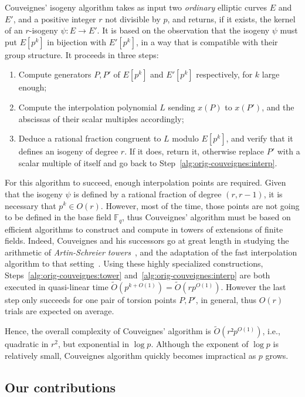 \documentclass{lms}
\newcommand{\F}{\mathbb{F}}
\newcommand{\tildO}{\tilde{O}}
\begin{document}
Couveignes' isogeny algorithm takes as input two \emph{ordinary}
elliptic curves $E$ and $E'$, and a positive integer $r$ not
divisible by $p$, and returns, if it exists, the kernel of an
$r$-isogeny $ψ:E\to E'$. It is based on the observation that the
isogeny $ψ$ must put $E[p^k]$ in bijection with $E'[p^k]$, in a way
that is compatible with their group structure. It proceeds in three
steps:
\begin{enumerate}
\item\label{alg:orig-couveignes:tower} Compute generators $P,P'$ of
  $E[p^k]$ and $E'[p^k]$ respectively, for $k$ large enough;
\item\label{alg:orig-couveignes:interp} Compute the interpolation
  polynomial $L$ sending $x(P)$ to $x(P')$, and the abscissas of
  their scalar multiples accordingly;
\item\label{alg:orig-couveignes:rational} Deduce a rational fraction
  congruent to $L$ modulo $E[p^k]$, and verify that it
  defines an isogeny of degree $r$. If it does, return it, otherwise
  replace $P'$ with a scalar multiple of itself and go back to
  Step~\ref{alg:orig-couveignes:interp}.
\end{enumerate}

For this algorithm to succeed, enough interpolation points are
required. Given that the isogeny $ψ$ is defined by a rational fraction
of degree $(r,r-1)$, it is necessary that $p^k∈O(r)$. However, most of
the time, those points are not going to be defined in the base field
$\F_q$, thus Couveignes' algorithm must be based on efficient
algorithms to construct and compute in towers of extensions of finite
fields. Indeed, Couveignes and his successors go at great length in
studying the arithmetic of \emph{Artin-Schreier
  towers}~\cite{couveignes00,df+schost12}, and the adaptation of the
fast interpolation algorithm to that setting~\cite{df10}.  Using these
highly specialized constructions,
Steps~\ref{alg:orig-couveignes:tower}
and~\ref{alg:orig-couveignes:interp} are both executed in quasi-linear
time $\tildO(p^{k+O(1)})=\tildO(rp^{O(1)})$. However the last step
only succeeds for one pair of torsion points $P,P'$, in general, thus
$O(r)$ trials are expected on average.

Hence, the overall complexity of Couveignes' algorithm is
$\tildO(r²p^{O(1)})$, i.e., quadratic in $r^2$, but exponential in
$\log p$. Although the exponent of $\log p$ is relatively small, Couveignes
algorithm quickly becomes impractical as $p$ grows.

\subsection{Our contributions}
\end{document}
